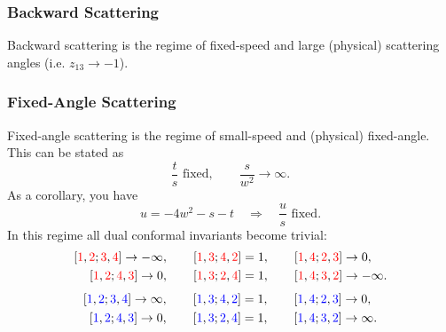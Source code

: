 \subsubsection{Backward Scattering}
Backward scattering is the regime of fixed-speed and large (physical) scattering angles (i.e. $z_{13} \rightarrow -1$).
\subsubsection{Fixed-Angle Scattering}
Fixed-angle scattering is the regime of small-speed and (physical) fixed-angle. This can be stated as
\begin{equation}
	\frac{t}{s} \text{ fixed}, \qquad \frac{s}{w^{2}} \rightarrow \infty.
\end{equation}
As a corollary, you have
\begin{equation}
	u = -4w^{2} - s - t \quad \Longrightarrow \quad \frac{u}{s} \text{ fixed}.
\end{equation}
In this regime all dual conformal invariants become trivial:
\begin{equation}
\begin{split}
	\left[ {\color{red} 1} , {\color{red} 2} ; {\color{red} 3} , {\color{red} 4} \right] \rightarrow -\infty, \qquad
	\left[ {\color{red} 1} , {\color{red} 3} ; {\color{red} 4} , {\color{red} 2} \right] &= 1, \qquad
	\left[ {\color{red} 1} , {\color{red} 4} ; {\color{red} 2} , {\color{red} 3} \right] \rightarrow 0, \\
	\left[ {\color{red} 1} , {\color{red} 2} ; {\color{red} 4} , {\color{red} 3} \right] \rightarrow 0, \qquad
	\left[ {\color{red} 1} , {\color{red} 3} ; {\color{red} 2} , {\color{red} 4} \right] &= 1, \qquad
	\left[ {\color{red} 1} , {\color{red} 4} ; {\color{red} 3} , {\color{red} 2} \right] \rightarrow -\infty.
\end{split}
\end{equation}
\begin{equation}
\begin{split}
	\left[ {\color{blue} 1} , {\color{blue} 2} ; {\color{blue} 3} , {\color{blue} 4} \right] \rightarrow \infty, \qquad
	\left[ {\color{blue} 1} , {\color{blue} 3} ; {\color{blue} 4} , {\color{blue} 2} \right] &= 1, \qquad
	\left[ {\color{blue} 1} , {\color{blue} 4} ; {\color{blue} 2} , {\color{blue} 3} \right] \rightarrow 0, \\
	\left[ {\color{blue} 1} , {\color{blue} 2} ; {\color{blue} 4} , {\color{blue} 3} \right] \rightarrow 0, \qquad
	\left[ {\color{blue} 1} , {\color{blue} 3} ; {\color{blue} 2} , {\color{blue} 4} \right] &= 1, \qquad
	\left[ {\color{blue} 1} , {\color{blue} 4} ; {\color{blue} 3} , {\color{blue} 2} \right] \rightarrow \infty.
\end{split}
\end{equation}
